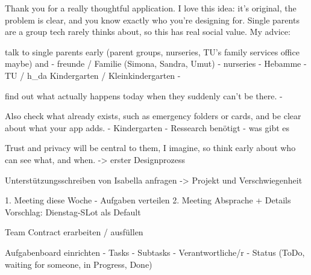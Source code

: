 Thank you for a really thoughtful application. I love this idea: it's original, the problem is clear, and you know exactly who you're
designing for. Single parents are a group tech rarely thinks about, so this has real social value.
My advice: 

talk to single parents early (parent groups, nurseries, TU's family services office maybe) and
- freunde / Familie (Simona, Sandra, Umut)
- nurseries
- Hebamme
- TU / h_da Kindergarten / Kleinkindergarten
- 

find out what actually happens today when they suddenly can't be there. 
- 

Also check what already exists, such as emergency folders or cards, and be clear about what your app adds.
- Kindergarten
- Ressearch benötigt - was gibt es

Trust and privacy will be central to them, I imagine, so think early about who can see what, and when.
-> erster Designprozess

Unterstützungsschreiben von Isabella anfragen
-> Projekt und Verschwiegenheit

1. Meeting diese Woche - Aufgaben verteilen
2. Meeting Absprache + Details
Vorschlag: Dienstag-SLot als Default

Team Contract erarbeiten / ausfüllen

Aufgabenboard einrichten
- Tasks
- Subtasks
- Verantwortliche/r
- Status (ToDo, waiting for someone, in Progress, Done)
